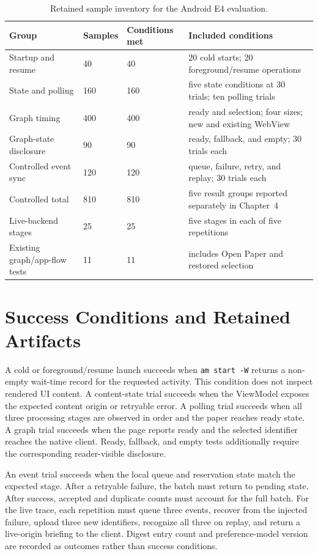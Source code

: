 \begin{longtable}{P{4.2cm}P{1.8cm}P{2.7cm}P{3.7cm}}
\caption{Retained sample inventory for the Android E4 evaluation.}
\label{tab:e4-sample-inventory}\\
\toprule
Group & Samples & Conditions met & Included conditions \\
\midrule
Startup and resume & 40 & 40 & 20 cold starts; 20 foreground/resume operations \\
State and polling & 160 & 160 & five state conditions at 30 trials; ten polling trials \\
Graph timing & 400 & 400 & ready and selection; four sizes; new and existing WebView \\
Graph-state disclosure & 90 & 90 & ready, fallback, and empty; 30 trials each \\
Controlled event sync & 120 & 120 & queue, failure, retry, and replay; 30 trials each \\
\midrule
Controlled total & 810 & 810 & five result groups reported separately in Chapter~4 \\
\addlinespace
Live-backend stages & 25 & 25 & five stages in each of five repetitions \\
Existing graph/app-flow tests & 11 & 11 & includes Open Paper and restored selection \\
\bottomrule
\end{longtable}

\section{Success Conditions and Retained Artifacts}

A cold or foreground/resume launch succeeds when \texttt{am start -W} returns a non-empty wait-time record for the requested activity.
This condition does not inspect rendered UI content.
A content-state trial succeeds when the ViewModel exposes the expected content origin or retryable error.
A polling trial succeeds when all three processing stages are observed in order and the paper reaches ready state.
A graph trial succeeds when the page reports ready and the selected identifier reaches the native client.
Ready, fallback, and empty tests additionally require the corresponding reader-visible disclosure.

An event trial succeeds when the local queue and reservation state match the expected stage.
After a retryable failure, the batch must return to pending state.
After success, accepted and duplicate counts must account for the full batch.
For the live trace, each repetition must queue three events, recover from the injected failure, upload three new identifiers, recognize all three on replay, and return a live-origin briefing to the client.
Digest entry count and preference-model version are recorded as outcomes rather than success conditions.

